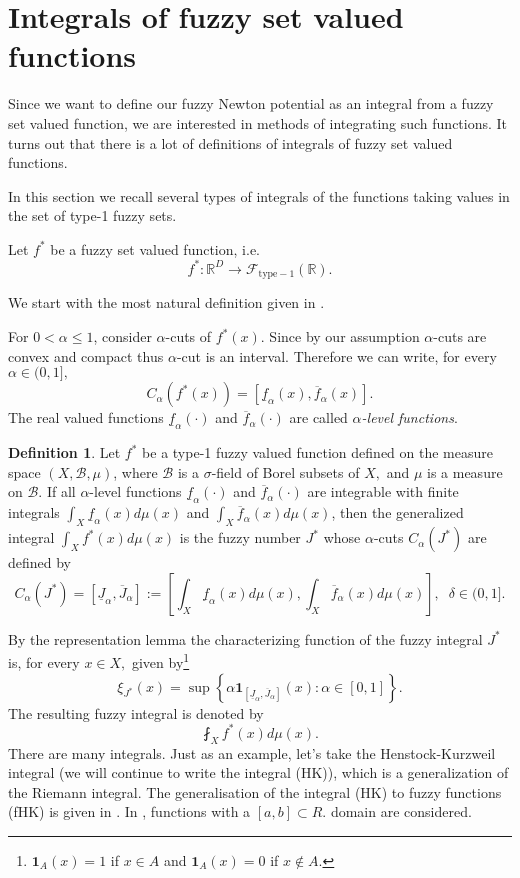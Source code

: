 \documentclass[leqno,12pt]{amsart}
\newcommand{\R}{\mathbb{R}}
\newcommand{\one}{\mathbf 1}
\theoremstyle{remark}
\theoremstyle{remark}
\theoremstyle{remark}
\theoremstyle{definition}
\newtheorem{definition}{Definition}
\numberwithin{equation}{section}
\begin{document}
\section{Integrals of fuzzy set valued functions}
Since we want to define our fuzzy Newton potential as an integral from a fuzzy set valued function, we are interested in methods of integrating such functions.
It turns out that there is a lot of definitions of integrals of fuzzy set valued functions.
\par
In this section we recall several types of integrals of the functions taking values in the set of  type-1 fuzzy sets.
\par
Let $f^*$ be a fuzzy set valued function, i.e.
$$f^*:\R^D\to\mathcal F_{\mathrm{type-1}}(\R).$$
\par
We start with the most natural definition given in \cite{20}.
\par
For $0<\alpha\leq 1$, consider $\alpha$-cuts of $f^*(x)$. Since by our assumption $\alpha$-cuts are convex and compact thus $\alpha$-cut is an interval. Therefore we can write, for every $\alpha\in(0,1],$
$$C_\alpha(f^*(x))=[\underline{f}_\alpha(x),\overline{f}_\alpha(x)].$$
The real valued functions $\underline{f}_\alpha(\cdot)$ and $\overline{f}_\alpha(\cdot)$ are called {\em $\alpha$-level functions}.
\begin{definition}\label{calkastandardowa}
Let $f^*$ be a type-1 fuzzy valued function defined on the measure space $(X,\mathcal B,\mu)$, where $\mathcal B$ is a $\sigma$-field of Borel subsets of $X,$ and $\mu$ is a measure on $\mathcal B.$ If all $\alpha$-level functions $\underline{f}_\alpha(\cdot)$ and $\overline{f}_\alpha(\cdot)$ are integrable with finite integrals $\int_X\underline{f}_\alpha(x)d\mu(x)$ and $\int_X\overline{f}_\alpha(x)d\mu(x)$, then the generalized integral $\int_X f^*(x)d\mu(x)$ is the fuzzy number $J^*$ whose $\alpha$-cuts $C_\alpha(J^*)$ are defined by
$$C_\alpha(J^*)=[\underline{J}_\alpha,\overline{J}_\alpha]:=
\left[\int_X\underline{f}_\alpha(x)d\mu(x),
\int_X\overline{f}_\alpha(x)d\mu(x)\right],\;\;\delta\in(0,1].$$
\end{definition}
By the representation lemma \cite[Lemma 2.1]{20} the characterizing function of the fuzzy integral $J^*$ is, for every $x\in X,$ given by\footnote{$\one_A(x)=1$ if $x\in A$ and $\one_A(x)=0$ if $x\not\in A.$}
$$\xi_{J^*}(x)=
\sup\left\{\alpha\one_{[\underline{J}_\alpha,
\overline{J}_\alpha]}(x):\alpha\in[0,1]\right\}.$$
The resulting fuzzy integral is denoted by
$$\fint_Xf^*(x)d\mu(x).$$
There are many integrals. Just as an example, let's take the Henstock-Kurzweil integral \cite{HK} (we will continue to write the integral (HK)), which is a generalization of the Riemann integral. The generalisation of the integral (HK) to fuzzy functions (fHK) is given in \cite{Musial}. In \cite{Musial}, functions with a $[a,b]\subset R.$ domain are considered.
\end{document}
